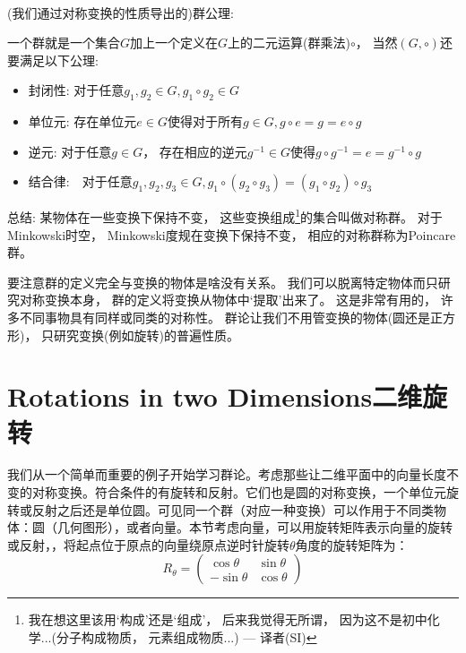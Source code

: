 \ 

(我们通过对称变换的性质导出的)群公理: 

一个群就是一个集合$G$加上一个定义在$G$上的二元运算(群乘法)$\circ$， 当然$(G, \circ)$还要满足以下公理: 
\begin{itemize}
	\item 封闭性: 对于任意$g_1, g_2 \in G, g_1 \circ g_2 \in G$
	
	\item 单位元: 存在单位元$e \in G$使得对于所有$g \in G, g\circ e = g = e \circ g$
	
	\item 逆元: 对于任意$g \in G$， 存在相应的逆元$g^{-1} \in G$使得$g \circ g^{-1} = e = g^{-1} \circ g$
	
	\item 结合律:　对于任意$g_1, g_2, g_3 \in G, g_1 \circ (g_2 \circ g_3) = (g_1 \circ g_2) \circ g_3$ 
\end{itemize}

总结: 某物体在一些变换下保持不变， 这些变换组成\footnote{我在想这里该用`构成'还是`组成'， 后来我觉得无所谓， 因为这不是初中化学...(分子构成物质， 元素组成物质...) --- 译者(SI)}的集合叫做对称群。 对于Minkowski时空， Minkowski度规在变换下保持不变， 相应的对称群称为Poincare群。

要注意群的定义完全与变换的物体是啥没有关系。 我们可以脱离特定物体而只研究对称变换本身， 群的定义将变换从物体中`提取'出来了。 这是非常有用的， 许多不同事物具有同样或同类的对称性。 群论让我们不用管变换的物体(圆还是正方形)， 只研究变换(例如旋转)的普遍性质。


\section[二维旋转]{Rotations in two Dimensions\quad 二维旋转}
\label{sec3.2}
我们从一个简单而重要的例子开始学习群论。考虑那些让二维平面中的向量长度不变的对称变换。符合条件的有旋转和反射。它们也是圆的对称变换，一个单位元旋转或反射之后还是单位圆。可见同一个群（对应一种变换）可以作用于不同类物体：圆（几何图形），或者向量。本节考虑向量，可以用旋转矩阵表示向量的旋转或反射，，将起点位于原点的向量绕原点逆时针旋转$\theta$角度的旋转矩阵为：
\begin{equation}
\label{equ3.3}
R_\theta = 
	\begin{pmatrix}
		\cos \theta & \sin \theta \\
		-\sin \theta & \cos \theta
	\end{pmatrix}
\end{equation}

